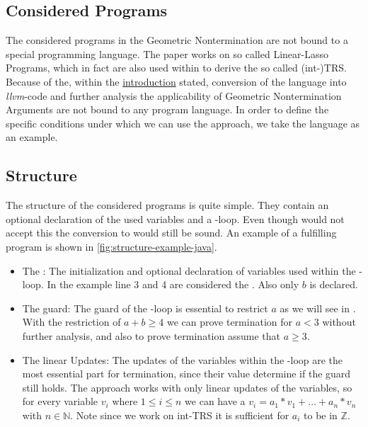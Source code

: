 \subsection{Considered Programs}
The considered programs in the Geometric Nontermination are not bound to a special programming language. The paper works on so called Linear-Lasso Programs, which in fact %
are also used within \aprove to derive the so called (int-)TRS. Because of the, within the \hyperref[sec:aprove]{introduction} stated, conversion of the language into \textit{llvm}-code and further analysis the applicability of Geometric Nontermination Arguments are not bound to any program language. \newline %
In order to define the specific conditions under which we can use the approach, we take the language  as an example.
\subsection{Structure}
\label{sec:structure}
The structure of the considered programs is quite simple. They contain an optional declaration of the used variables and a -loop. Even though  would not accept this the conversion to  would still be sound. An example of a fulfilling  program is shown in \autoref{fig:structure-example-java}. 
\begin{itemize}
	\item The \stem: \newline
		The initialization and optional declaration of variables used within the -loop. In the example line 3 and 4 are considered the \stem. Also only $b$ is declared.
	\item The guard: \newline
		The guard of the -loop is essential to restrict $a$  as we will see in %
		. With the restriction of $a+b\ge 4 $ we can prove termination for $a < 3$ without further analysis, and also to prove termination assume that $a \ge 3$.
	\item The linear Updates: \newline
		The updates of the variables within the -loop are the most essential part for termination, since their value determine if the guard still holds. The approach works with only linear updates of the variables, so for every variable $v_i$ where $1\le i\le n$ we can have a $v_i=a_1*v_1+...+a_n*v_n$ with $n \in \mathbb{N}$. Note since we work on int-TRS it is sufficient for $a_i$ to be in $\mathbb{Z}$. 	
\end{itemize} 

